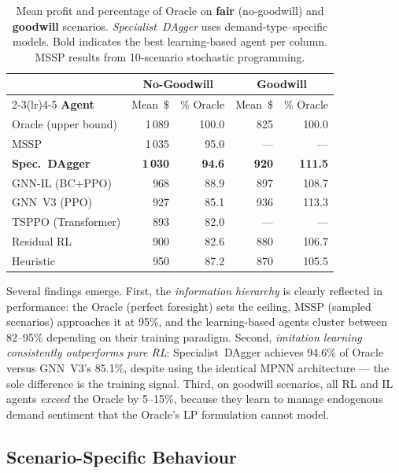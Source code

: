 \begin{table}[htbp]
\centering
\caption{Mean profit and percentage of Oracle on \textbf{fair} (no-goodwill)
and \textbf{goodwill} scenarios. \emph{Specialist~DAgger} uses
demand-type--specific models. Bold indicates the best learning-based agent
per column. MSSP results from 10-scenario stochastic programming.}
\label{tab:main_results}
\small
\begin{tabular}{lrrrr}
\toprule
                   & \multicolumn{2}{c}{\textbf{No-Goodwill}} &
                     \multicolumn{2}{c}{\textbf{Goodwill}} \\
\cmidrule(lr){2-3}\cmidrule(lr){4-5}
\textbf{Agent}     & Mean~\$ & \% Oracle & Mean~\$ & \% Oracle \\
\midrule
Oracle (upper bound)    & 1\,089  & 100.0 & 825   & 100.0 \\
MSSP                    & 1\,035  & 95.0  & ---   & --- \\
\textbf{Spec.\ DAgger}  & \textbf{1\,030}  & \textbf{94.6}  &
                          \textbf{920}   & \textbf{111.5} \\
GNN-IL (BC+PPO)         & 968    & 88.9  & 897   & 108.7 \\
GNN~V3 (PPO)            & 927    & 85.1  & 936   & 113.3 \\
TSPPO (Transformer)     & 893    & 82.0  & ---   & --- \\
Residual RL             & 900    & 82.6  & 880   & 106.7 \\
Heuristic               & 950    & 87.2  & 870   & 105.5 \\
\bottomrule
\end{tabular}
\end{table}

Several findings emerge. First, the \emph{information hierarchy} is clearly
reflected in performance: the Oracle (perfect foresight) sets the ceiling,
MSSP (sampled scenarios) approaches it at 95\%, and the learning-based agents
cluster between 82--95\% depending on their training paradigm. Second,
\emph{imitation learning consistently outperforms pure RL}: Specialist~DAgger
achieves 94.6\% of Oracle versus GNN~V3's 85.1\%, despite using the identical
MPNN architecture --- the sole difference is the training signal. Third, on
goodwill scenarios, all RL and IL agents \emph{exceed} the Oracle by
5--15\%, because they learn to manage endogenous demand sentiment that the
Oracle's LP formulation cannot model.

\subsection{Scenario-Specific Behaviour}\label{sec:scenario}

